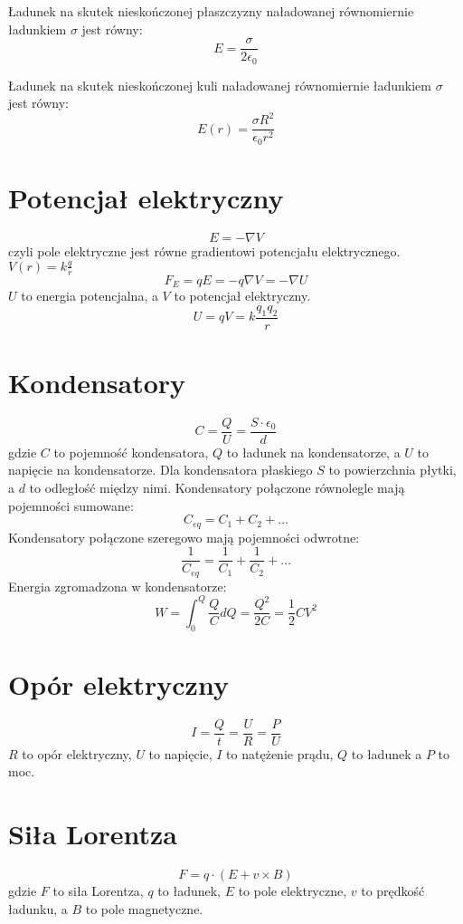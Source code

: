 \documentclass{../konspekt}
\begin{document}
\begin{multicols}{2}
  Ładunek na skutek nieskończonej płaszczyzny naładowanej równomiernie
  ładunkiem $\sigma$ jest równy:
  $$
  E = \frac{\sigma}{2\epsilon_0}
  $$

  Ładunek na skutek nieskończonej kuli naładowanej równomiernie
  ładunkiem $\sigma$ jest równy:
  $$
  E(r) = \frac{\sigma R^2}{\epsilon_0 r^2}
  $$

  \section{Potencjał elektryczny}

  $$
  E = - \nabla V
  $$
  czyli pole elektryczne jest równe gradientowi potencjału
  elektrycznego. $V(r) = k\frac{q}{r}$
  $$
  F_E = qE = -q \nabla V = - \nabla U
  $$
  $U$ to energia potencjalna, a $V$ to potencjał elektryczny.
  $$
  U = qV = k \frac{q_1 q_2}{r}
  $$

  \section{Kondensatory}

  $$
  C = \frac{Q}{U} = \frac{S \cdot \epsilon_0}{d}
  $$
  gdzie $C$ to pojemność kondensatora, $Q$ to ładunek na
  kondensatorze, a $U$ to napięcie na kondensatorze. Dla kondensatora
  płaskiego $S$ to powierzchnia płytki, a $d$ to odległość między
  nimi. Kondensatory połączone równolegle mają pojemności sumowane:
  $$
  C_{eq} = C_1 + C_2 + \ldots
  $$
  Kondensatory połączone szeregowo mają pojemności odwrotne:
  $$
  \frac{1}{C_{eq}} = \frac{1}{C_1} + \frac{1}{C_2} + \ldots
  $$
  Energia zgromadzona w kondensatorze:
  $$
  W = \int_{0}^{Q} \frac{Q}{C} dQ = \frac{Q^2}{2C} = \frac{1}{2} C V^2
  $$

  \section{Opór elektryczny}

  $$
  I = \frac{Q}{t} = \frac{U}{R} = \frac{P}{U}
  $$
  $R$ to opór elektryczny, $U$ to napięcie, $I$ to natężenie prądu,
  $Q$ to ładunek a $P$ to moc.

  \section{Siła Lorentza}

  $$
  F = q \cdot (E + v \times B)
  $$
  gdzie $F$ to siła Lorentza, $q$ to ładunek, $E$ to pole elektryczne,
  $v$ to prędkość ładunku, a $B$ to pole magnetyczne.


\end{multicols}
\end{document}
